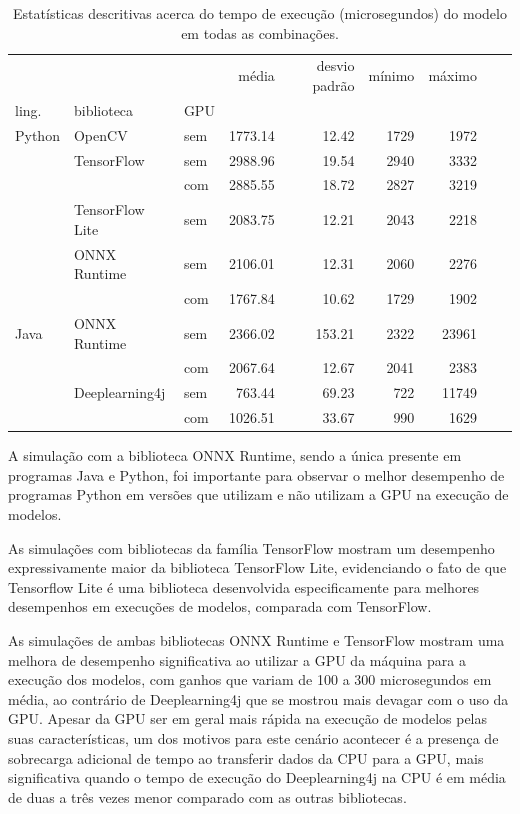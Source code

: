 \begin{table}
  \centering
  \begin{tabular}{lllrrrrrr}
    \toprule
           &                 &     & média   & desvio padrão & mínimo & máximo \\
    ling.  & biblioteca      & GPU &         &               &        &        \\
    \midrule
    Python & OpenCV          & sem & 1773.14 & 12.42         & 1729   & 1972   \\
           & TensorFlow      & sem & 2988.96 & 19.54         & 2940   & 3332   \\
           &                 & com & 2885.55 & 18.72         & 2827   & 3219   \\
           & TensorFlow Lite & sem & 2083.75 & 12.21         & 2043   & 2218   \\
           & ONNX Runtime    & sem & 2106.01 & 12.31         & 2060   & 2276   \\
           &                 & com & 1767.84 & 10.62         & 1729   & 1902   \\
    Java   & ONNX Runtime    & sem & 2366.02 & 153.21        & 2322   & 23961  \\
           &                 & com & 2067.64 & 12.67         & 2041   & 2383   \\
           & Deeplearning4j  & sem & 763.44  & 69.23         & 722    & 11749  \\
           &                 & com & 1026.51 & 33.67         & 990    & 1629   \\

    \bottomrule
  \end{tabular}
  \caption{Estatísticas descritivas acerca do tempo de execução (microsegundos) do modelo em todas as combinações.}
  \label{tab:all}
\end{table}

A simulação com a biblioteca ONNX Runtime, sendo a única presente em programas Java e Python, foi importante para observar o melhor desempenho de programas Python em versões que utilizam e não utilizam a GPU na execução de modelos.

As simulações com bibliotecas da família TensorFlow mostram um desempenho expressivamente maior da biblioteca TensorFlow Lite, evidenciando o fato de que Tensorflow Lite é uma biblioteca desenvolvida especificamente para melhores desempenhos em execuções de modelos, comparada com TensorFlow.

As simulações de ambas bibliotecas ONNX Runtime e TensorFlow mostram uma melhora de desempenho significativa ao utilizar a GPU da máquina para a execução dos modelos, com ganhos que variam de 100 a 300 microsegundos em média, ao contrário de Deeplearning4j que se mostrou mais devagar com o uso da GPU. Apesar da GPU ser em geral mais rápida na execução de modelos pelas suas características, um dos motivos para este cenário acontecer é a presença de sobrecarga adicional de tempo ao transferir dados da CPU para a GPU, mais significativa quando o tempo de execução do Deeplearning4j na CPU é em média de duas a três vezes menor comparado com as outras bibliotecas.

